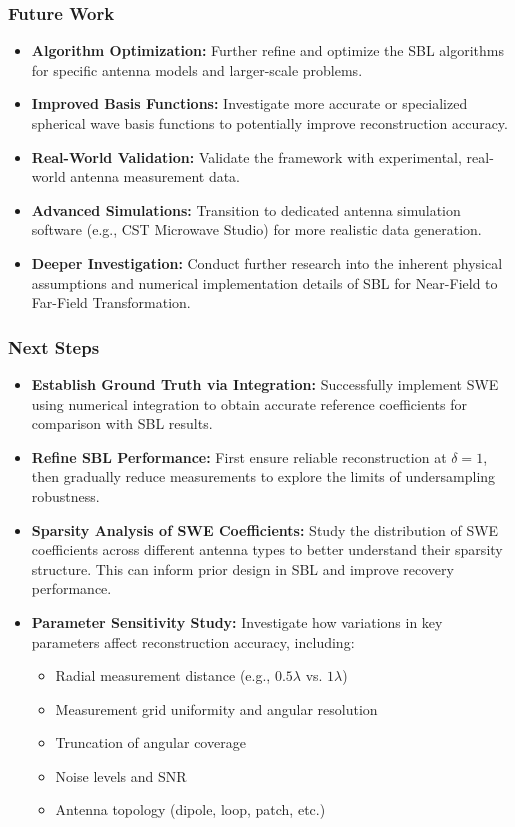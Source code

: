 \documentclass{beamer}
\begin{document}
\begin{frame}
    \frametitle{Future Work}
    \begin{itemize}
        \item \textbf{Algorithm Optimization:} Further refine and optimize the SBL algorithms for specific antenna models and larger-scale problems.
        \item \textbf{Improved Basis Functions:} Investigate more accurate or specialized spherical wave basis functions to potentially improve reconstruction accuracy.
        \item \textbf{Real-World Validation:} Validate the framework with experimental, real-world antenna measurement data.
        \item \textbf{Advanced Simulations:} Transition to dedicated antenna simulation software (e.g., CST Microwave Studio) for more realistic data generation.
        \item \textbf{Deeper Investigation:} Conduct further research into the inherent physical assumptions and numerical implementation details of SBL for Near-Field to Far-Field Transformation.
    \end{itemize}
\end{frame}

\begin{frame}
    \frametitle{Next Steps}
    \begin{itemize}
    	\item \textbf{Establish Ground Truth via Integration:} Successfully implement SWE using numerical integration to obtain accurate reference coefficients for comparison with SBL results.
    	\item \textbf{Refine SBL Performance:} First ensure reliable reconstruction at $\delta = 1$, then gradually reduce measurements to explore the limits of undersampling robustness.
    	\item \textbf{Sparsity Analysis of SWE Coefficients:} Study the distribution of SWE coefficients across different antenna types to better understand their sparsity structure. This can inform prior design in SBL and improve recovery performance.
    	\item \textbf{Parameter Sensitivity Study:} Investigate how variations in key parameters affect reconstruction accuracy, including:
    	\begin{itemize}
    		\item Radial measurement distance (e.g., $0.5\lambda$ vs. $1\lambda$)
        \item Measurement grid uniformity and angular resolution
        \item Truncation of angular coverage
        \item Noise levels and SNR
        \item Antenna topology (dipole, loop, patch, etc.)
    	\end{itemize}
    \end{itemize}
\end{frame}
\end{document}
